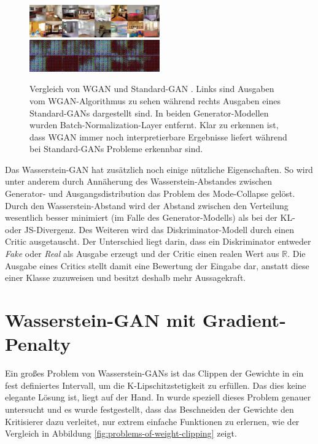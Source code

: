 \documentclass{hsflensburg}
\begin{document}
  \begin{figure}
    \includegraphics[width=0.5\textwidth]{images/image-022.png}
    \includegraphics[width=0.5\textwidth]{images/image-024.png}
    \caption{Vergleich von WGAN und Standard-GAN \cite{arjovsky2017wasserstein}.
      Links sind Ausgaben vom WGAN-Algorithmus zu sehen während rechts Ausgaben
      eines Standard-GANs dargestellt sind. In beiden Generator-Modellen wurden
      Batch-Normalization-Layer entfernt. Klar zu erkennen ist, dass WGAN immer
      noch interpretierbare Ergebnisse liefert während bei Standard-GANs Probleme
      erkennbar sind.}
    \label{fig:wgan-gan-no-batchnorm}
  \end{figure}

  Das Wasserstein-GAN hat zusätzlich noch einige nützliche Eigenschaften. So
  wird unter anderem durch Annäherung des Wasserstein-Abstandes zwischen
  Generator- und Ausgangsdistribution das Problem des Mode-Collapse gelöst.
  Durch den Wasserstein-Abstand wird der Abstand zwischen den Verteilung
  wesentlich besser minimiert (im Falle des Generator-Modells) als bei der KL-
  oder JS-Divergenz.  Des Weiteren wird das Diskriminator-Modell durch einen
  Critic ausgetauscht.  Der Unterschied liegt darin, dass ein Diskriminator
  entweder \textit{Fake} oder \textit{Real} als Ausgabe erzeugt und der Critic
  einen realen Wert aus $\mathbb{R}$. Die Ausgabe eines Critics stellt damit
  eine Bewertung der Eingabe dar, anstatt diese einer Klasse zuzuweisen und
  besitzt deshalb mehr Aussagekraft.

  \section{Wasserstein-GAN mit Gradient-Penalty}
  Ein großes Problem von Wasserstein-GANs ist das Clippen der Gewichte in ein
  fest definiertes Intervall, um die K-Lipschitzstetigkeit zu erfüllen. Das dies
  keine elegante Lösung ist, liegt auf der Hand. In \cite{gulrajani2017improved}
  wurde speziell dieses Problem genauer untersucht und es wurde festgestellt,
  dass das Beschneiden der Gewichte den Kritisierer dazu verleitet, nur extrem
  einfache Funktionen zu erlernen, wie der Vergleich in Abbildung
  \ref{fig:problems-of-weight-clipping} zeigt. 
\end{document}
